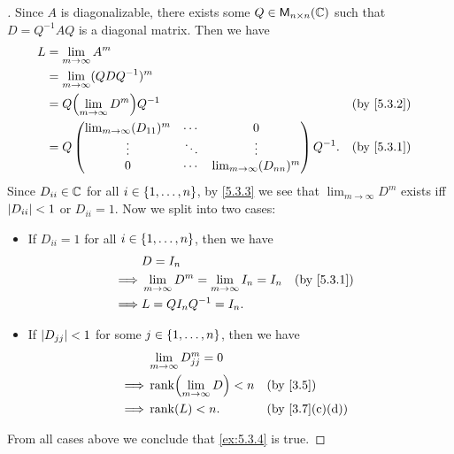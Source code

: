 \begin{proof}[]
  Since \(A\) is diagonalizable, there exists some \(Q \in \mathsf{M}_{{n} \times n}({\mathbb{C}})\) such that \(D = Q^{-1} A Q\) is a diagonal matrix.
  Then we have
  \begin{align*}
    L & = \lim_{m \to \infty} A^m                                                                                   \\
      & = \lim_{m \to \infty} (Q D Q^{-1})^m                                                                        \\
      & = Q \pa{\lim_{m \to \infty} D^m} Q^{-1}                                       &  & \text{(by \cref{5.3.2})} \\
      & = Q \begin{pmatrix}
              \lim_{m \to \infty} (D_{1 1})^m & \cdots & 0                               \\
              \vdots                          & \ddots & \vdots                          \\
              0                               & \cdots & \lim_{m \to \infty} (D_{n n})^m
            \end{pmatrix} Q^{-1}. &  & \text{(by \cref{5.3.1})}                              \\
  \end{align*}
  Since \(D_{i i} \in \mathbb{C}\) for all \(i \in \left\lbrace1, \dots, n\right\rbrace\), by \cref{5.3.3} we see that \(\lim_{m \to \infty} D^m\) exists iff \(\left\lvert D_{i i}\right\rvert < 1\) or \(D_{i i} = 1\).
  Now we split into two cases:
  \begin{itemize}
    \item If \(D_{i i} = 1\) for all \(i \in \left\lbrace1, \dots, n\right\rbrace\), then we have
          \begin{align*}
                     & D = I_n                                                                               \\
            \implies & \lim_{m \to \infty} D^m = \lim_{m \to \infty} I_n = I_n &  & \text{(by \cref{5.3.1})} \\
            \implies & L = Q I_n Q^{-1} = I_n.
          \end{align*}
    \item If \(\left\lvert D_{j j}\right\rvert < 1\) for some \(j \in \left\lbrace1, \dots, n\right\rbrace\), then we have
          \begin{align*}
                     & \lim_{m \to \infty} D_{j j}^m = 0                                   \\
            \implies & \rk{\lim_{m \to \infty} D} < n    &  & \text{(by \cref{3.5})}       \\
            \implies & \rk{L} < n.                       &  & \text{(by \cref{3.7}(c)(d))}
          \end{align*}
  \end{itemize}
  From all cases above we conclude that \cref{ex:5.3.4} is true.
\end{proof}

